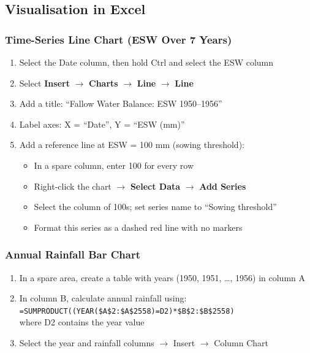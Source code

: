 \subsection{Visualisation in Excel}

\subsubsection{Time-Series Line Chart (ESW Over 7 Years)}

\begin{enumerate}
  \item Select the Date column, then hold Ctrl and select the ESW column
  \item Select \textbf{Insert} $\to$ \textbf{Charts} $\to$ \textbf{Line} $\to$ \textbf{Line}
  \item Add a title: ``Fallow Water Balance: ESW 1950--1956''
  \item Label axes: X = ``Date'', Y = ``ESW (mm)''
  \item Add a reference line at ESW = 100 mm (sowing threshold):
    \begin{itemize}
      \item In a spare column, enter 100 for every row
      \item Right-click the chart $\to$ \textbf{Select Data} $\to$ \textbf{Add Series}
      \item Select the column of 100s; set series name to ``Sowing threshold''
      \item Format this series as a dashed red line with no markers
    \end{itemize}
\end{enumerate}

\subsubsection{Annual Rainfall Bar Chart}

\begin{enumerate}
  \item In a spare area, create a table with years (1950, 1951, \ldots, 1956) in column A
  \item In column B, calculate annual rainfall using:\\
    \texttt{=SUMPRODUCT((YEAR(\$A\$2:\$A\$2558)=D2)*\$B\$2:\$B\$2558)}\\
    where D2 contains the year value
  \item Select the year and rainfall columns $\to$ Insert $\to$ Column Chart
\end{enumerate}

